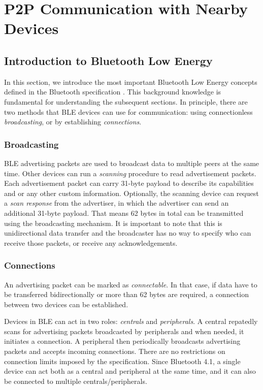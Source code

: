 \section{P2P Communication with Nearby Devices}

\subsection{Introduction to Bluetooth Low Energy}

In this section, we introduce the most important Bluetooth Low Energy concepts defined in the Bluetooth specification \cite{bluetooth51spec}. This background knowledge is fundamental for understanding the subsequent sections. In principle, there are two methods that BLE devices can use for communication: using connectionless \textit{broadcasting}, or by establishing \textit{connections}.

\subsubsection{Broadcasting}

BLE advertising packets are used to broadcast data to multiple peers at the same time. Other devices can run a \textit{scanning} procedure to read advertisement packets. Each advertisement packet can carry 31-byte payload to describe its capabilities and or any other custom information. Optionally, the scanning device can request a \textit{scan response} from the advertiser, in which the advertiser can send an additional 31-byte payload. That means 62 bytes in total can be transmitted using the broadcasting mechanism. It is important to note that this is unidirectional data transfer and the broadcaster has no way to specify who can receive those packets, or receive any acknowledgements.

\subsubsection{Connections}

An advertising packet can be marked as \textit{connectable}. In that case, if data have to be transferred bidirectionally or more than 62 bytes are required, a connection between two devices can be established.

Devices in BLE can act in two roles: \textit{centrals} and \textit{peripherals}. A central repatedly scans for advertising packets broadcasted by peripherals and when needed, it initiates a connection. A peripheral then periodically broadcasts advertising packets and accepts incoming connections. There are no restrictions on connection limits imposed by the specification. Since Bluetooth 4.1, a single device can act both as a central and peripheral at the same time, and it can also be connected to multiple centrals/peripherals.

